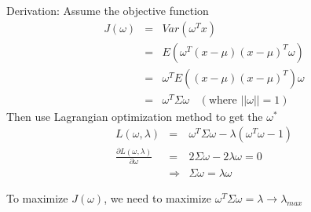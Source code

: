 \documentclass[letterpaper,10pt]{article}
\begin{document}
Derivation: Assume the objective function
\begin{equation}
\begin{array}{rcl}
J(\omega) & = & Var(\omega^Tx) \\
		  & = & E(\omega^T(x-\mu)(x-\mu)^T\omega) \\
		  & = & \omega^TE((x-\mu)(x-\mu)^T)\omega \\
		  & = & \omega^T\Sigma\omega~~~~(\text{where~} ||\omega||=1)
\end{array}
\end{equation}
Then use Lagrangian optimization method to get the $\omega^*$
\begin{equation}
\begin{array}{rcl}
L(\omega,\lambda) & = & \omega^T\Sigma\omega - \lambda(\omega^T\omega-1) \\
\frac{\partial L(\omega,\lambda)}{\partial\omega} & = & 2\Sigma\omega-2\lambda\omega=0 \\
& \Rightarrow & \Sigma\omega=\lambda\omega
\end{array}
\end{equation}

To maximize $J(\omega)$, we need to maximize $\omega^T\Sigma\omega=\lambda \rightarrow \lambda_{max}$
 
\end{document}
